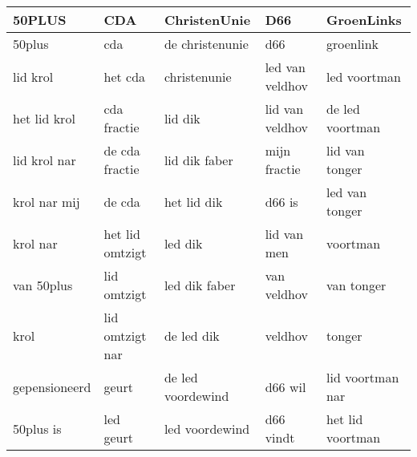 \begin{tabular}{lllll}
\toprule
        50PLUS &              CDA &       ChristenUnie &              D66 &        GroenLinks \\
\midrule
        50plus &              cda &    de christenunie &              d66 &         groenlink \\
      lid krol &          het cda &       christenunie &  led van veldhov &      led voortman \\
  het lid krol &      cda fractie &            lid dik &  lid van veldhov &   de led voortman \\
  lid krol nar &   de cda fractie &      lid dik faber &     mijn fractie &    lid van tonger \\
  krol nar mij &           de cda &        het lid dik &           d66 is &    led van tonger \\
      krol nar &  het lid omtzigt &            led dik &      lid van men &          voortman \\
    van 50plus &      lid omtzigt &      led dik faber &      van veldhov &        van tonger \\
          krol &  lid omtzigt nar &         de led dik &          veldhov &            tonger \\
 gepensioneerd &            geurt &  de led voordewind &          d66 wil &  lid voortman nar \\
     50plus is &        led geurt &     led voordewind &        d66 vindt &  het lid voortman \\
\bottomrule
\end{tabular}
